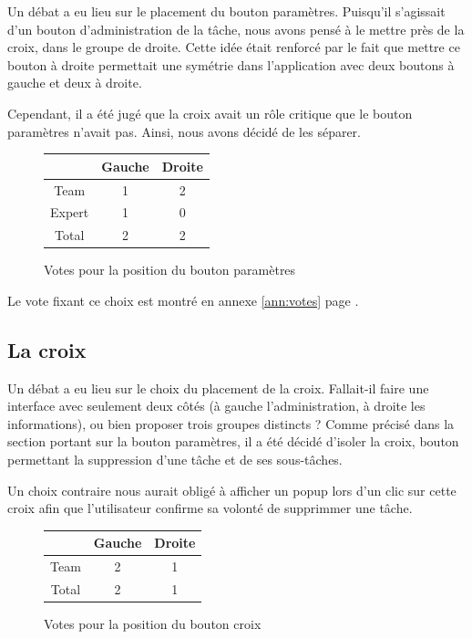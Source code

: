 \documentclass[11pt]{article}
\begin{document}
Un débat a eu lieu sur le placement du bouton paramètres. Puisqu'il
s'agissait d'un bouton d'administration de la tâche, nous avons pensé
à le mettre près de la croix, dans le groupe de droite. Cette idée
était renforcé par le fait que mettre ce bouton à droite permettait
une symétrie dans l'application avec deux boutons à gauche et deux à
droite.

Cependant, il a été jugé que la croix avait un rôle critique que le
bouton paramètres n'avait pas. Ainsi, nous avons décidé de les
séparer.

\begin{figure}[!h]
  \centering
  \begin{tabular}[!h]{cc|c}
    & Gauche & Droite\\
    \hline
    Team & 1 & 2\\
    Expert & 1 & 0\\
    \hline
    Total & 2 & 2\\
  \end{tabular}
  \caption{Votes pour la position du bouton paramètres}
  \label{fig:voteparam}
\end{figure}

Le vote fixant ce choix est montré en annexe \ref{ann:votes} page \pageref{fig:paramvote}.



\subsection{La croix}
\label{subsec:croixPlacement}

Un débat a eu lieu sur le choix du placement de la croix. Fallait-il
faire une interface avec seulement deux côtés (à gauche
l'administration, à droite les informations), ou bien proposer trois
groupes distincts ? Comme précisé dans la section portant sur la
bouton paramètres, il a été décidé d'isoler la croix, bouton
permettant la suppression d'une tâche et de ses sous-tâches.

Un choix contraire nous aurait obligé à afficher un popup lors d'un
clic sur cette croix afin que l'utilisateur confirme sa volonté de
supprimmer une tâche.

\begin{figure}[!h]
  \centering
  \begin{tabular}[!h]{cc|c}
    & Gauche & Droite\\
    \hline
    Team & 2 & 1\\
    \hline
    Total & 2 & 1\\
  \end{tabular}
  \caption{Votes pour la position du bouton croix}
  \label{fig:votecroix}
\end{figure}
\end{document}
